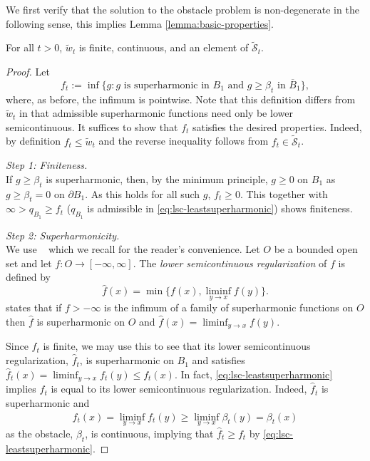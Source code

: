 \documentclass[12pt]{amsart}
\numberwithin{equation}{section}
\newcommand{\mclSshift}[2]{\hyperref[eq:shifted-supersolutions]{\mathcal{\tilde{S}}^{#1}_{#2}}}
\newcommand{\lssshift}[2]{\hyperref[eq:appendix-least-supersolution]{\tilde{w}^{#1}_{#2}}}
\begin{document}
	We first verify that the solution to the obstacle problem is non-degenerate in the following sense, this implies
	Lemma \ref{lemma:basic-properties}. 
	\begin{lemma}\label{lemma:appendix-basic-properties}
		For all $t > 0$, $\lssshift{}{t}$ is finite, continuous, and an element of $\mclSshift{}{t}$. 
	\end{lemma}
	\begin{proof}
		Let 
		\begin{equation} \label{eq:lsc-leastsuperharmonic}
		f_t  := \inf \{ g: g \mbox{ is superharmonic in $B_1$ and $g \geq \beta_t$ in $\overline{B}_1$} \},
		\end{equation}
		where, as before, the infimum is pointwise. 
		Note that this definition differs from $\lssshift{}{t}$ in that admissible superharmonic functions need only be lower semicontinuous. 
		It suffices to show that $f_t$ satisfies the desired properties. Indeed, by definition $f_t \leq  \lssshift{}{t}$
		and the reverse inequality follows from $f_t \in \mclSshift{}{t}$.
		
		{\it Step 1: Finiteness.} \\
		If $g \geq \beta_t$ is superharmonic, then, by the minimum principle, $g \geq 0$ on $B_1$ as $g \geq \beta_t = 0$ on $\partial B_1$. 
		As this holds for all such $g$, $f_t \geq 0$. This together with $\infty > q_{B_1} \geq f_t$ ($q_{B_1}$ is admissible in \eqref{eq:lsc-leastsuperharmonic}) shows finiteness.
		
		{\it Step 2: Superharmonicity.} \\
		We use ~\cite[Theorem 3.7.5]{armitage2000classical}
		which we recall for the reader's convenience. Let $O$ be a bounded open set and let $f:O \to [-\infty, \infty]$.
		The {\it lower semicontinuous regularization} of $f$ is defined by 
		\begin{equation} \label{eq:lower-semicontinuous}
		\hat{f}(x) = \min \{ f(x), \liminf_{y \to x} f(y) \}.
		\end{equation}
		\cite[Theorem 3.7.5]{armitage2000classical} states that if $f > -\infty$ is the infimum of a family of superharmonic functions on $O$
		then $\hat{f}$ is superharmonic on $O$ and $\hat{f}(x) = \liminf_{y \to x} f(y)$. 
		
		Since $f_t$ is finite, we may use this to see that its lower semicontinuous regularization, $\hat{f}_t$, is superharmonic on $B_1$ and satisfies $\hat{f}_t(x) = \liminf_{y \to x} f_t(y) \leq f_t(x)$.
		In fact, \eqref{eq:lsc-leastsuperharmonic} implies $f_t$ is equal to its lower semicontinuous regularization. Indeed, $\hat{f}_t$ is superharmonic and 
		\[
		\hat{f}_t(x) = \liminf_{y \to x} f_t(y) \geq \liminf_{ y \to x} \beta_t(y) =  \beta_t(x)
		\]
		as the obstacle, $\beta_t$, is continuous, implying that $\hat{f}_t \geq f_t$ by \eqref{eq:lsc-leastsuperharmonic}.
		

\end{proof}
\end{document}
